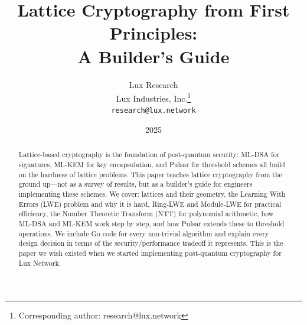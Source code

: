 \documentclass[11pt,a4paper]{article}
\title{Lattice Cryptography from First Principles:\\A Builder's Guide}
\author{
Lux Research \\
Lux Industries, Inc.\thanks{Corresponding author: research@lux.network}\\
\texttt{research@lux.network}
}
\date{2025}
\begin{document}
\luxcoverpage

\begin{abstract}
Lattice-based cryptography is the foundation of post-quantum security: ML-DSA
for signatures, ML-KEM for key encapsulation, and Pulsar for threshold schemes
all build on the hardness of lattice problems. This paper teaches lattice cryptography
from the ground up---not as a survey of results, but as a builder's guide for engineers
implementing these schemes. We cover: lattices and their geometry, the Learning With Errors
(LWE) problem and why it is hard, Ring-LWE and Module-LWE for practical efficiency, the
Number Theoretic Transform (NTT) for polynomial arithmetic, how ML-DSA and ML-KEM work
step by step, and how Pulsar extends these to threshold operations. We include Go code
for every non-trivial algorithm and explain every design decision in terms of the
security/performance tradeoff it represents. This is the paper we wish existed when we
started implementing post-quantum cryptography for Lux Network.
\end{abstract}

\tableofcontents
\newpage













\end{document}
